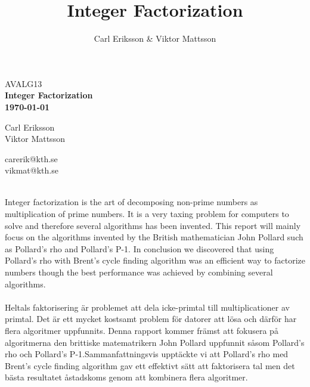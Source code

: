 \documentclass[a4paper,12pt]{article}
\author{Carl Eriksson & Viktor Mattsson}
\begin{document}
\title{Integer Factorization}   
    
	\begin{titlepage}
    	\centering
    	\small
    	AVALG13\\
    	\vspace*{6\baselineskip}
    	\Large
    	\bfseries
    	Integer Factorization\\
    	\normalsize
        \textbf{\today} \\[2\baselineskip]

        \begin{minipage}{0.4\textwidth}
        \begin{flushleft} 
        Carl Eriksson\\
        Viktor Mattsson\\
        \end{flushleft}
        \end{minipage}
        \begin{minipage}{0.25\textwidth}
        \begin{flushleft} 
        carerik@kth.se\\
        vikmat@kth.se\\
        \end{flushleft}
        \end{minipage}

        \vspace*{10\baselineskip}
    \end{titlepage}

    \newpage

    \\

    Integer factorization is the art of decomposing non-prime numbers as multiplication of prime numbers. It is a very taxing problem for computers to solve and therefore several algorithms has been invented. This report will mainly focus on the algorithms invented by the British mathematician John Pollard such as Pollard's rho and Pollard's P-1. In conclusion we discovered that using Pollard's rho with Brent's cycle finding algorithm was an efficient way to factorize numbers though the best performance was achieved by combining several algorithms.\\

    \\

    Heltals faktorisering är problemet att dela icke-primtal till multiplicationer av primtal. Det är ett mycket kostsamt problem för datorer att lösa och därför har flera algoritmer uppfunnits. Denna rapport kommer främst att fokusera på algoritmerna den brittiske matematrikern John Pollard uppfunnit såsom Pollard's rho och Pollard's P-1.Sammanfattningsvis upptäckte vi att Pollard's rho med Brent’s cycle finding algorithm gav ett effektivt sätt att faktorisera tal men det bästa resultatet åstadskoms genom att kombinera flera algoritmer.
\end{document}
